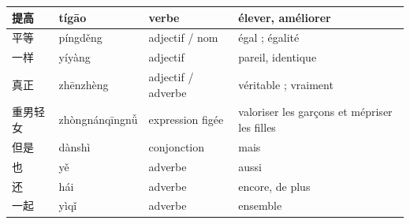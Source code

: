 \documentclass[11pt]{article}
\begin{document}
\begin{center}
\begin{tabularx}{\linewidth}{|X|X|X|X|}
\hline
\rowcolor{popgreenL} 提高 & tígāo & verbe & élever, améliorer \\
\hline
\rowcolor{poporangeL} 平等 & píngděng & adjectif / nom & égal ; égalité \\
\hline
\rowcolor{poporangeL} 一样 & yíyàng & adjectif & pareil, identique \\
\hline
\rowcolor{poporangeL} 真正 & zhēnzhèng & adjectif / adverbe & véritable ; vraiment \\
\hline
\rowcolor{poporangeL} 重男轻女 & zhòngnánqīngnǚ & expression figée & valoriser les garçons et mépriser les filles \\
\hline
但是 & dànshì & conjonction & mais \\
\hline
也 & yě & adverbe & aussi \\
\hline
还 & hái & adverbe & encore, de plus \\
\hline
一起 & yìqǐ & adverbe & ensemble \\
\hline
\end{tabularx}
\end{center}
\end{document}
